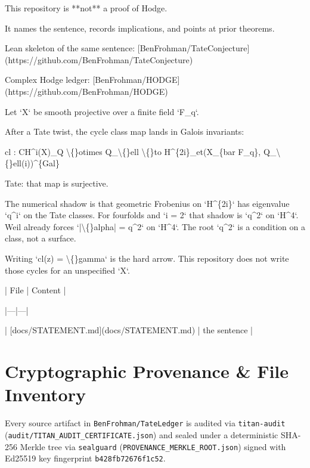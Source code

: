 \documentclass[11pt,a4paper]{article}
\begin{document}
This repository is **not** a proof of Hodge.

It names the sentence, records implications, and points at prior theorems.

Lean skeleton of the same sentence: [BenFrohman/TateConjecture](https://github.com/BenFrohman/TateConjecture)

Complex Hodge ledger: [BenFrohman/HODGE](https://github.com/BenFrohman/HODGE)

Let `X` be smooth projective over a finite field `F\_q`.

After a Tate twist, the cycle class map lands in Galois invariants:

cl : CH\textasciicircum{}i(X)\_Q \textbackslash\{\}otimes Q\_\textbackslash\{\}ell  \textbackslash\{\}to  H\textasciicircum{}\{2i\}\_et(X\_\{bar F\_q\}, Q\_\textbackslash\{\}ell(i))\textasciicircum{}\{Gal\}

Tate: that map is surjective.

The numerical shadow is that geometric Frobenius on `H\textasciicircum{}\{2i\}` has eigenvalue `q\textasciicircum{}i` on the Tate classes. For fourfolds and `i = 2` that shadow is `q\textasciicircum{}2` on `H\textasciicircum{}4`. Weil already forces `|\textbackslash\{\}alpha| = q\textasciicircum{}2` on `H\textasciicircum{}4`. The root `q\textasciicircum{}2` is a condition on a class, not a surface.

Writing `cl(z) = \textbackslash\{\}gamma` is the hard arrow. This repository does not write those cycles for an unspecified `X`.

| File | Content |

|---|---|

| [docs/STATEMENT.md](docs/STATEMENT.md) | the sentence |

\section{Cryptographic Provenance \& File Inventory}
Every source artifact in \texttt{BenFrohman/TateLedger} is audited via \texttt{titan-audit}
(\texttt{audit/TITAN\_AUDIT\_CERTIFICATE.json}) and sealed under a deterministic SHA-256 Merkle tree via
\texttt{sealguard} (\texttt{PROVENANCE\_MERKLE\_ROOT.json}) signed with Ed25519 key fingerprint
\texttt{b428fb72676f1c52}.
\end{document}
